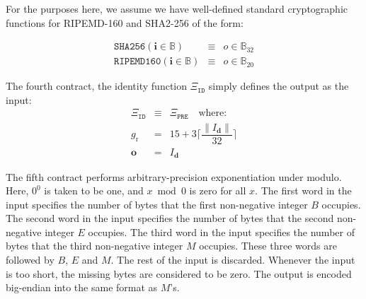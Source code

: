 \documentclass[9pt,oneside]{amsart}
\begin{document}
For the purposes here, we assume we have well-defined standard cryptographic functions for RIPEMD-160 and SHA2-256 of the form:

\begin{eqnarray}
\mathtt{SHA256}(\mathbf{i} \in \mathbb{B}) & \equiv & o \in \mathbb{B}_{32} \\
\mathtt{RIPEMD160}(\mathbf{i} \in \mathbb{B}) & \equiv & o \in \mathbb{B}_{20}
\end{eqnarray}

The fourth contract, the identity function $\Xi_{\mathtt{ID}}$ simply defines the output as the input:
\begin{eqnarray}
\Xi_{\mathtt{ID}} &\equiv& \Xi_{\mathtt{PRE}} \quad \text{where:} \\
g_{\mathrm{r}} &=& 15 + 3\Big\lceil \dfrac{\lVert I_{\mathbf{d}} \rVert}{32} \Big\rceil\\
\mathbf{o} &=& I_{\mathbf{d}}
\end{eqnarray}

The fifth contract performs arbitrary-precision exponentiation under modulo. Here, $0 ^ 0$ is taken to be one, and $x \bmod 0$ is zero for all $x$. The first word in the input specifies the number of bytes that the first non-negative integer $B$ occupies. The second word in the input specifies the number of bytes that the second non-negative integer $E$ occupies. The third word in the input specifies the number of bytes that the third non-negative integer $M$ occupies. These three words are followed by $B$, $E$ and $M$. The rest of the input is discarded. Whenever the input is too short, the missing bytes are considered to be zero. The output is encoded big-endian into the same format as $M$'s.
\end{document}
